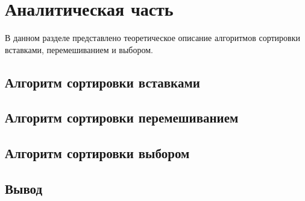 \chapter{Аналитическая часть}

В данном разделе представлено теоретическое описание алгоритмов сортировки вставками, перемешиванием и выбором.

\section{Алгоритм сортировки вставками}

\cite{sorts}

\section{Алгоритм сортировки перемешиванием}

\section{Алгоритм сортировки выбором}

\section{Вывод}
